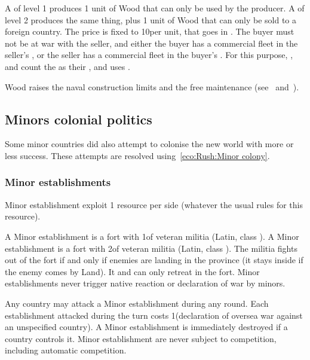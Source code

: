  A  \MNU of level 1 produces 1 unit of Wood
that can only be used by the producer. A  \MNU of level 2 produces
the same thing, plus 1 unit of Wood that can only be sold to a foreign
country.
\bparag The price is fixed to 10\ducats per unit, that goes in
.
\bparag The buyer must not be at war with the seller, and either the buyer has
a commercial fleet in the seller's \CTZ, or the seller has a commercial fleet
in the buyer's \CTZ.
\bparag For this purpose, \PRU, \POL and \SUE count the  as
their \CTZ, and \POR uses .

 Wood raises the naval construction limits and the free
maintenance (see~
and~).



\subsection{Minors colonial politics}

\aparag Some minor countries did also attempt to colonise the new world with
more or less success.
\bparag These attempts are resolved using~\ref{eco:Rush:Minor colony}.


\subsubsection{Minor establishments}
\aparag[Effects] Minor establishment exploit 1 resource per side (whatever the
usual rules for this resource).

\aparag[Military] A Minor establishment \Facemoins is a fort with 1\LDE of
veteran militia (Latin, class \CAIII).
\bparag A Minor establishment \Faceplus is a fort with 2\LDE of veteran
militia (Latin, class \CAIII).
\bparag The militia fights out of the fort if and only if enemies are landing
in the province (it stays inside if the enemy comes by Land). It and can only
retreat in the fort.
\bparag Minor establishments never trigger native reaction or declaration of
war by \ROTW minors.

\aparag[Destruction] Any country may attack a Minor establishment during any
round.
\bparag Each establishment attacked during the turn costs 1\STAB (declaration
of oversea war against an unspecified country).
\bparag A Minor establishment is immediately destroyed if a country controls
it.
\bparag Minor establishment are never subject to competition, including
automatic competition.


